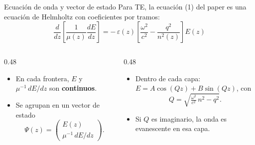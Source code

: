 \documentclass[aspectratio=169,10pt]{beamer}
\begin{document}
\begin{frame}{Ecuación de onda y vector de estado}
  Para TE, la ecuación (1) del paper es una ecuación de Helmholtz con coeficientes por tramos:
  \[
    \frac{d}{dz}\!\left[\frac{1}{\mu(z)}\frac{dE}{dz}\right]
    = -\,\varepsilon(z)\left[\frac{\omega^2}{c^2}-\frac{q^2}{n^2(z)}\right]E(z)
  \]
  \begin{columns}[T]
    \begin{column}{0.48\textwidth}
      \begin{itemize}
        \item En cada frontera, $E$ y $\mu^{-1}\,dE/dz$ son \textbf{continuos}.
        \item Se agrupan en un vector de estado
          \[ \Psi(z) = \begin{pmatrix} E(z) \\ \mu^{-1}\,dE/dz \end{pmatrix}. \]
      \end{itemize}
    \end{column}
    \begin{column}{0.48\textwidth}
      \begin{itemize}
        \item Dentro de cada capa: $E = A\cos(Qz) + B\sin(Qz)$, con
          \[ Q = \sqrt{\tfrac{\omega^2}{c^2}\,n^2 - q^2}. \]
        \item Si $Q$ es imaginario, la onda es evanescente en esa capa.
      \end{itemize}
    \end{column}
  \end{columns}
\end{frame}
\end{document}
